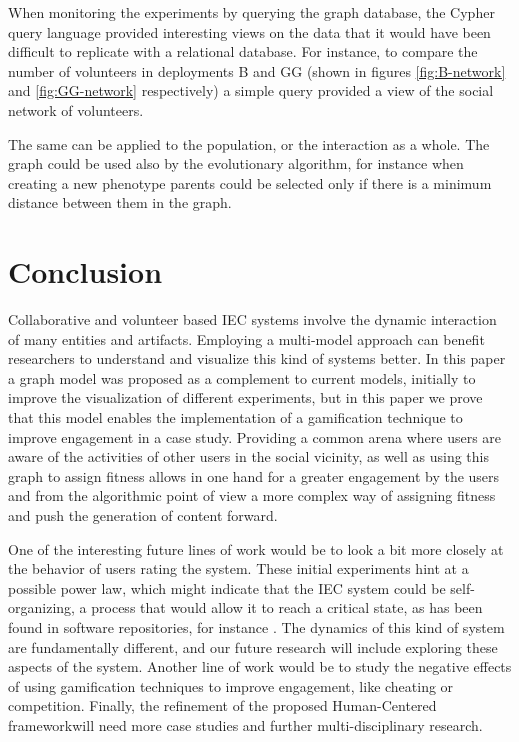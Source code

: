\documentclass[conference]{IEEEtran}
\begin{document}
When monitoring the experiments by querying the graph database,  the Cypher query language 
provided interesting views on the data that it would have been
difficult to replicate with a relational database. 
For instance, to compare the number of volunteers in deployments
B and GG (shown in figures \ref{fig:B-network} and \ref{fig:GG-network} respectively)  a simple query
provided a view of the social network of volunteers. 

The same can be applied to 
the population, or the interaction as a whole. The graph could be used also by the evolutionary
algorithm, for instance when creating a new phenotype 
parents could be selected only if there is a minimum distance between them in the graph.

\section{Conclusion}
\label{sec:conclusions}


Collaborative and volunteer based IEC systems involve the dynamic 
interaction of many entities and artifacts. Employing a multi-model approach
can benefit researchers to understand and visualize this kind of systems better.
In this paper a graph model was proposed as a complement to current
models, initially to improve the visualization of different
experiments, but in this paper we prove that this model  enables
the implementation of a gamification technique to improve engagement in
a case study. Providing a common arena where users are aware of the
activities of other users in the social vicinity, as well as using
this graph to assign fitness allows in one hand for a greater
engagement by the users and from the algorithmic point of view a more
complex way of assigning fitness and push the generation of content
forward. 

One of the interesting future lines of work would be to look a bit
more closely at the behavior of users rating the system. These initial
experiments hint at a possible power law, which might indicate that
the IEC system could be self-organizing, a process that would allow it
to reach a critical state, as has been found in software repositories,
for instance \cite{Merelo2016:repomining}. The dynamics of this kind
of system are fundamentally different, and our future research will
include exploring these aspects of the system. Another line of work would be to study the negative effects of using 
gamification techniques to improve engagement, like cheating or competition.
Finally, the refinement of the proposed Human-Centered frameworkwill need
more case studies and further multi-disciplinary research. 
\end{document}

